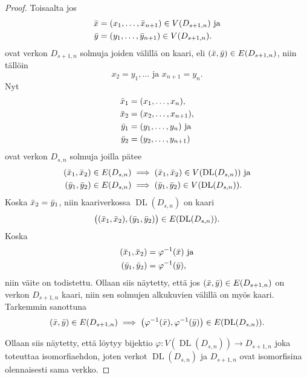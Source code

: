 \documentclass[finnish]{tktltiki2}
\theoremstyle{definition}
\theoremstyle{remark}
\newcommand{\from}{\colon}
\DeclareMathOperator{\DL}{DL}
\newcommand{\Dsn}{D_{s,n}}
\newcommand{\Dssn}{D_{s+1,n}}
\begin{document}
\begin{proof}
    Toisaalta jos
    \begin{align*}
        \x &= (x_1, \dots, \x_{n+1}) \in V(\Dssn) \text{ ja} \\
        \y &= (y_1, \dots, \y_{n+1}) \in V(\Dssn).
    \end{align*}
    ovat verkon $\Dssn$ solmuja joiden välillä on kaari, eli $(\x, \y) \in
    E(\Dssn)$, niin tällöin
    \begin{equation*}
        x_2 = y_1, \dots \text{ ja } x_{n+1} = y_n.
    \end{equation*}
    Nyt
    \begin{align*}
        \bar{x}_1 &= (x_1, \dots, x_n), \\
        \bar{x}_2 &= (x_2, \dots, x_{n+1}), \\
        \bar{y}_1 &= (y_1, \dots, y_n) \text{ ja } \\
        \bar{y}_2 &= (y_2, \dots, y_{n+1})
    \end{align*}
    ovat verkon $\Dsn$ solmuja joilla pätee
    \begin{align*}
        (\x_1, \x_2) \in E(\Dsn) &\implies (\x_1, \x_2) \in V(\DL(\Dsn)) \text{ ja} \\
        (\y_1, \y_2) \in E(\Dsn) &\implies (\y_1, \y_2) \in V(\DL(\Dsn)).
    \end{align*}
    Koska $\bar{x}_2 = \bar{y}_1$, niin kaariverkossa $\DL(\Dsn)$ on kaari
    \begin{equation*}
        \big((\x_1, \x_2), (\y_1, \y_2)\big) \in E(\DL(\Dsn)).
    \end{equation*}
    Koska
    \begin{align*}
        (\bar{x}_1, \bar{x}_2) &= \varphi^{-1}(\bar{x}) \text{ ja} \\
        (\bar{y}_1, \bar{y}_2) &= \varphi^{-1}(\bar{y}),
    \end{align*}
    niin väite on todistettu. Ollaan siis näytetty, että jos $(\x, \y) \in
    E(\Dssn)$ on verkon $\Dssn$ kaari, niin sen solmujen alkukuvien välillä on
    myös kaari. Tarkemmin sanottuna
    \begin{equation*}
        (\x, \y) \in E(\Dssn) \implies \big(
                                           \varphi^{-1}(\x), \varphi^{-1}(\y)
                                       \big) \in E(\DL(\Dsn)).
    \end{equation*}

    Ollaan siis näytetty, että löytyy bijektio $\varphi \from V(\DL(\Dsn)) \to
    \Dssn$ joka toteuttaa isomorfiaehdon, joten verkot $\DL(\Dsn)$ ja $\Dssn$
    ovat isomorfisina olennaisesti sama verkko.
\end{proof}
\end{document}
